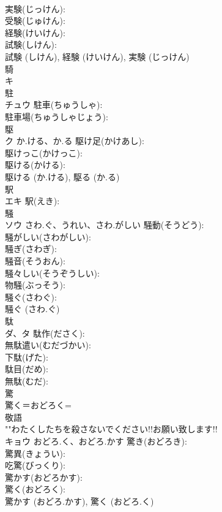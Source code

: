 \documentclass[8pt]{extreport}
\begin{document}
\begin{CJK}{UTF8}{min}
\\	実験(じっけん): 
\\	受験(じゅけん): 
\\	経験(けいけん): 
\\	試験(しけん): 
\\	試験 (しけん), 経験 (けいけん), 実験 (じっけん)
\\	騎			
\\	キ			
\\	駐			
\\	チュウ		駐車(ちゅうしゃ): 
\\	駐車場(ちゅうしゃじょう): 
\\	駆			
\\	ク	か.ける、か.る	駆け足(かけあし): 
\\	駆けっこ(かけっこ): 
\\	駆ける(かける): 
\\	駆ける (か.ける), 駆る (か.る)
\\	駅			
\\	エキ		駅(えき): 
\\	騒			
\\	ソウ	さわ.ぐ、うれい、さわ.がしい	騒動(そうどう): 
\\	騒がしい(さわがしい): 
\\	騒ぎ(さわぎ): 
\\	騒音(そうおん): 
\\	騒々しい(そうぞうしい): 
\\	物騒(ぶっそう): 
\\	騒ぐ(さわぐ): 
\\	騒ぐ (さわ.ぐ)
\\	駄			
\\	ダ、タ		駄作(ださく): 
\\	無駄遣い(むだづかい): 
\\	下駄(げた): 
\\	駄目(だめ): 
\\	無駄(むだ): 
\\	驚			
\\	驚く＝おどろく= 
\\	敬語 
\\	""わたくしたちを殺さないでください!!お願い致します!!
\\	キョウ	おどろ.く、おどろ.かす	驚き(おどろき): 
\\	驚異(きょうい): 
\\	吃驚(びっくり): 
\\	驚かす(おどろかす): 
\\	驚く(おどろく): 
\\	驚かす (おどろ.かす), 驚く (おどろ.く)

\end{CJK}
\end{document}
